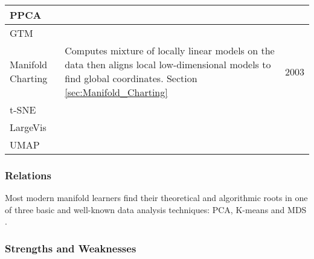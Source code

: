 \begin{longtable}{ |p{}|p{}|p{}| }
	\hline
	PPCA  & ~   & ~\\
	\hline
	GTM  & ~  & ~\\
	\hline
	Manifold Charting  & Computes mixture of locally linear models on the data then aligns local low-dimensional models to find global coordinates. Section \ref{sec:Manifold_Charting} & 2003 \\
	\hline
	t-SNE  & ~  & ~ \\
	\hline
	LargeVis  & ~  & ~ \\
	\hline
	UMAP  & ~  & ~ \\
	\hline
\end{longtable}

\subsubsection{Relations}

Most modern manifold learners find their theoretical and algorithmic roots in one of three basic and well-known data analysis techniques: PCA, K-means and MDS \citep{Kegl2008PrincipalManifoldsTextbook}.

\subsubsection{Strengths and Weaknesses}

